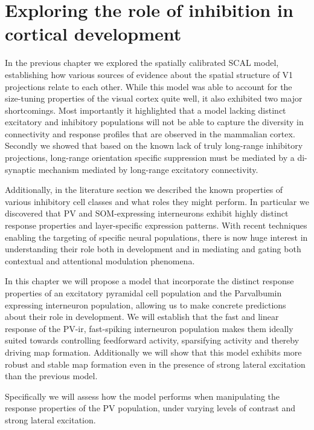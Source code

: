 \chapter{Exploring the role of inhibition in cortical development}

In the previous chapter we explored the spatially calibrated SCAL
model, establishing how various sources of evidence about the spatial
structure of V1 projections relate to each other. While this model was
able to account for the size-tuning properties of the visual cortex
quite well, it also exhibited two major shortcomings. Most importantly
it highlighted that a model lacking distinct excitatory and inhibitory
populations will not be able to capture the diversity in connectivity
and response profiles that are observed in the mammalian
cortex. Secondly we showed that based on the known lack of truly
long-range inhibitory projections, long-range orientation specific
suppression must be mediated by a di-synaptic mechanism mediated by
long-range excitatory connectivity.

Additionally, in the literature section we described the known
properties of various inhibitory cell classes and what roles they
might perform. In particular we discovered that PV and SOM-expressing
interneurons exhibit highly distinct response properties and
layer-specific expression patterns. With recent techniques enabling
the targeting of specific neural populations, there is now huge
interest in understanding their role both in development and in
mediating and gating both contextual and attentional modulation
phenomena.

In this chapter we will propose a model that incorporate the distinct
response properties of an excitatory pyramidal cell population and the
Parvalbumin expressing interneuron population, allowing us to make
concrete predictions about their role in development. We will
establish that the fast and linear response of the PV-ir, fast-spiking
interneuron population makes them ideally suited towards controlling
feedforward activity, sparsifying activity and thereby driving map
formation. Additionally we will show that this model exhibits more
robust and stable map formation even in the presence of strong lateral
excitation than the previous model.

Specifically we will assess how the model performs when manipulating
the response properties of the PV population, under varying levels of
contrast and strong lateral excitation.

